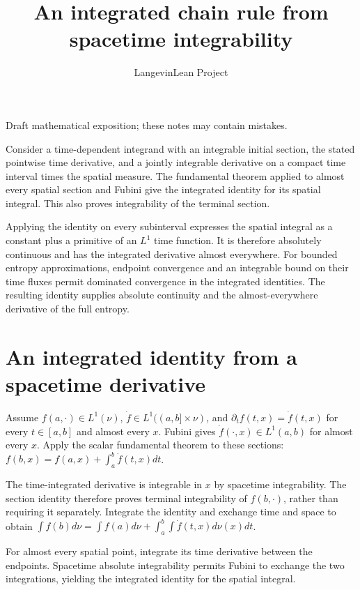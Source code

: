 \documentclass[11pt,a4paper]{article}
\title{\texorpdfstring{An integrated chain rule from spacetime integrability}{An integrated chain rule from spacetime integrability}}
\author{LangevinLean Project}
\date{}
\begin{document}
\maketitle
Draft mathematical exposition; these notes may contain mistakes.


Consider a time-dependent integrand with an integrable initial section, the stated pointwise time derivative, and a jointly integrable derivative on a compact time interval times the spatial measure. The fundamental theorem applied to almost every spatial section and Fubini give the integrated identity for its spatial integral. This also proves integrability of the terminal section.



Applying the identity on every subinterval expresses the spatial integral as a constant plus a primitive of an \(L^1\) time function. It is therefore absolutely continuous and has the integrated derivative almost everywhere. For bounded entropy approximations, endpoint convergence and an integrable bound on their time fluxes permit dominated convergence in the integrated identities. The resulting identity supplies absolute continuity and the almost-everywhere derivative of the full entropy.


\section{\texorpdfstring{An integrated identity from a spacetime derivative}{An integrated identity from a spacetime derivative}}


Assume \(f(a,\cdot)\in L^1(\nu)\), \(\dot f\in L^1((a,b]\times\nu)\), and \(\partial_t f(t,x)=\dot f(t,x)\) for every \(t\in[a,b]\) and almost every \(x\). Fubini gives \(\dot f(\cdot,x)\in L^1(a,b)\) for almost every \(x\). Apply the scalar fundamental theorem to these sections: \(f(b,x)=f(a,x)+\int_a^b\dot f(t,x)dt\).



The time-integrated derivative is integrable in \(x\) by spacetime integrability. The section identity therefore proves terminal integrability of \(f(b,\cdot)\), rather than requiring it separately. Integrate the identity and exchange time and space to obtain \(\int f(b)d\nu=\int f(a)d\nu+\int_a^b\int\dot f(t,x)d\nu(x)dt\).



For almost every spatial point, integrate its time derivative between the endpoints. Spacetime absolute integrability permits Fubini to exchange the two integrations, yielding the integrated identity for the spatial integral.
\end{document}
